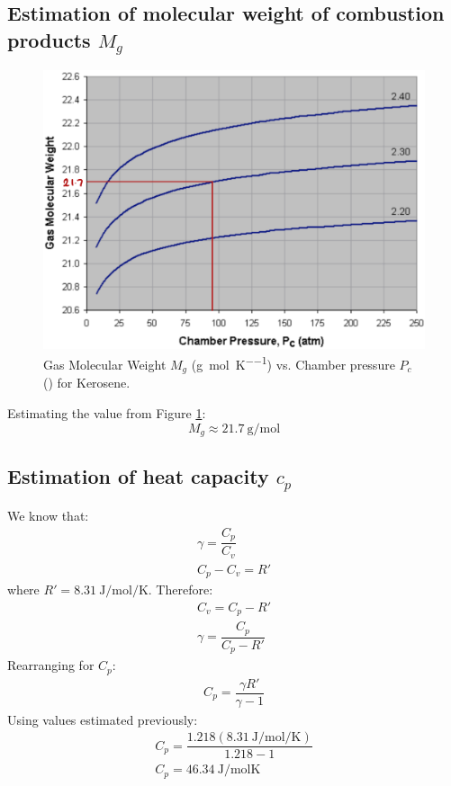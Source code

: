 \documentclass[11pt]{article}
\numberwithin{equation}{section}
\begin{document}
\subsection{Estimation of molecular weight of combustion products $M_g$}
\begin{figure}[H]
    \centering
    \includegraphics[height = 50ex]{./img/gasMolecularWeight.png}
    \caption{Gas Molecular Weight $M_g$ (\si{\gram\per\mol\per\kelvin}) vs. Chamber pressure $P_c$ (\si{\atm}) for Kerosene.}
    \label{gasMW}
\end{figure}
Estimating the value from Figure \ref{gasMW}:
\begin{equation}
    M_g \approx \SI{21.7}{\gram\per\mol}
\end{equation}
\subsection{Estimation of heat capacity $c_p$}
We know that:
\begin{gather}
    \gamma = \dfrac{C_p}{C_v}\\
    C_p - C_v = R'
\end{gather}
where $R' = \SI{8.31}{\joule\per\mol\per\kelvin}$. Therefore:
\begin{gather}
    C_v = C_p - R'\\
    \gamma = \dfrac{C_p}{C_p - R'}
\end{gather}
Rearranging for $C_p$:
\begin{gather}
    C_p = \dfrac{\gamma R'}{\gamma -1}
\end{gather}
Using values estimated previously:
\begin{gather}
    C_p = \dfrac{1.218(\SI{8.31}{\joule\per\mol\per\kelvin})}{1.218-1}\\
    C_p = \SI{46.34}{\joule\per\mol\kelvin}
\end{gather}
\end{document}
